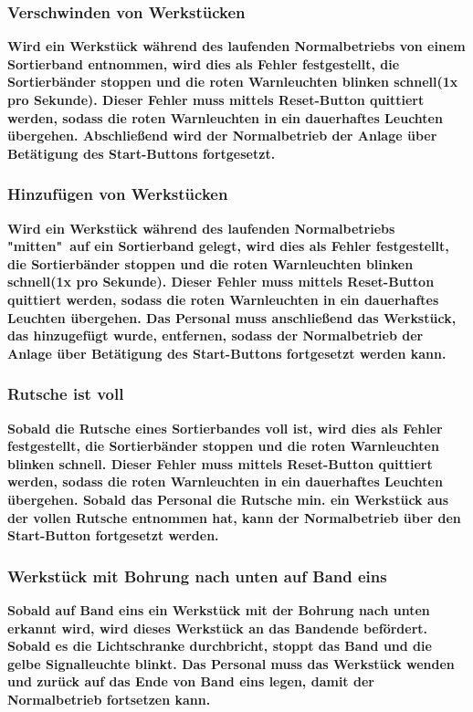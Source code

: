 \documentclass[oneside,a4paper,titlepage]{scrartcl} %
\begin{document}
\subsubsection{Verschwinden von Werkstücken}
\textbf{Wird ein Werkstück während des laufenden Normalbetriebs von einem Sortierband entnommen, wird dies als Fehler festgestellt, die Sortierbänder stoppen und die roten Warnleuchten blinken schnell(1x pro Sekunde). Dieser Fehler muss mittels Reset-Button quittiert werden, sodass die roten Warnleuchten in ein dauerhaftes Leuchten übergehen. Abschließend wird der Normalbetrieb der Anlage über Betätigung des Start-Buttons fortgesetzt. }

\subsubsection{Hinzufügen von Werkstücken}
\textbf{Wird ein Werkstück während des laufenden Normalbetriebs "mitten"\ auf ein Sortierband gelegt, wird dies als Fehler festgestellt, die Sortierbänder stoppen und die roten Warnleuchten blinken schnell(1x pro Sekunde). Dieser Fehler muss mittels Reset-Button quittiert werden, sodass die roten Warnleuchten in ein dauerhaftes Leuchten übergehen. Das Personal muss anschließend das Werkstück, das hinzugefügt wurde, entfernen, sodass der Normalbetrieb der Anlage über Betätigung des Start-Buttons fortgesetzt werden kann.}

\subsubsection{Rutsche ist voll}
\textbf{Sobald die Rutsche eines Sortierbandes voll ist, wird dies als Fehler festgestellt, die Sortierbänder stoppen und die roten Warnleuchten blinken schnell. Dieser Fehler muss mittels Reset-Button quittiert werden, sodass die roten Warnleuchten in ein dauerhaftes Leuchten übergehen. Sobald das Personal die Rutsche min. ein Werkstück aus der vollen Rutsche entnommen hat, kann der Normalbetrieb über den Start-Button fortgesetzt werden. }

\subsubsection{Werkstück mit Bohrung nach unten auf Band eins}
\textbf{Sobald auf Band eins ein Werkstück mit der Bohrung nach unten erkannt wird, wird dieses Werkstück an das Bandende befördert. Sobald es die Lichtschranke durchbricht, stoppt das Band und die gelbe Signalleuchte blinkt. Das Personal muss das Werkstück wenden und zurück auf das Ende von Band eins legen, damit der Normalbetrieb fortsetzen kann. }
\end{document}
